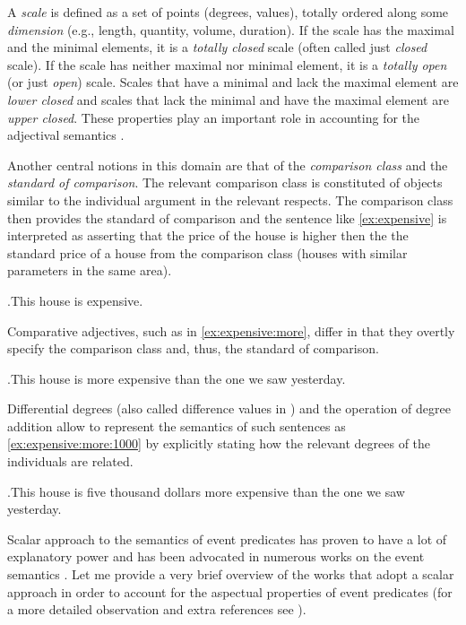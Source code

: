  A \textit{scale} is defined as a set of points (degrees, values), %
 totally ordered along some \textit{dimension} (e.g., length, quantity, volume, duration). If the scale has the maximal and the minimal elements, it is a \textit{totally closed} scale (often called just \textit{closed} scale). If the scale has neither maximal nor minimal element, it is a \textit{totally open} (or just \textit{open}) scale. Scales that have a minimal and lack the maximal element are \textit{lower closed} and scales that lack the minimal and have the maximal element are \textit{upper closed}. These properties play an important role in accounting for the adjectival semantics \citep[see, e.g.,][]{KennedyMcNally:05, RotsteinWinter:04, KaganAlexeyenko:10}.
 
Another central notions in this domain are that of the \textit{comparison class} and the \textit{standard of comparison}. The relevant comparison class \citep[see, e.g.][]{Klein:80, KennedyMcNally:05, Kennedy:07} is constituted of objects similar to the individual argument in the relevant respects. The comparison class then provides the standard of comparison and the sentence like \ref{ex:expensive} is interpreted as asserting that the price of the house is higher then the the standard price of a house from the comparison class (houses with similar parameters in the same area).
 
 \ex.\label{ex:expensive}This house is expensive.

Comparative adjectives, such as in \ref{ex:expensive:more}, differ in that they overtly specify the comparison class and, thus, the standard of comparison. 

 \ex.\label{ex:expensive:more}This house is more expensive than the one we saw yesterday.
 
Differential degrees \citep{Kennedy:01} (also called difference values in \citealt{KennedyLevin:02}) and the operation of degree addition \citep{KennedyLevin:02} allow to represent the semantics of such sentences as \ref{ex:expensive:more:1000} by explicitly stating how the relevant degrees of the individuals are related.
 
 \ex.\label{ex:expensive:more:1000}This house is five thousand dollars more expensive than the one we saw yesterday.

Scalar approach to the semantics of event predicates has proven to have a lot of explanatory power and has been advocated in numerous works on the event semantics \citep[see, e.g.,][]{Ramchand:97, Hay:99, KennedyLevin:02, CaudalNicolas:05, FilipRothstein:05, Kearns:07, KennedyLevin:08, Filip:08, Pinon:08, Rappaport:08, Rappaport:11, McNally:11}. Let me provide a very brief overview of the works that adopt a scalar approach in order to account for the aspectual properties of event predicates (for a more detailed observation and extra references see \citealt{Arsenijevic:13}).

